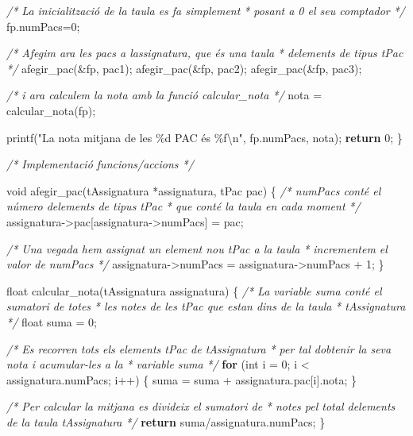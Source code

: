 \documentclass[]{book}
\newenvironment{Shaded}{\begin{snugshade}}{\end{snugshade}}
\newcommand{\CommentTok}[1]{\textcolor[rgb]{0.56,0.35,0.01}{\textit{#1}}}
\newcommand{\ControlFlowTok}[1]{\textcolor[rgb]{0.13,0.29,0.53}{\textbf{#1}}}
\newcommand{\DataTypeTok}[1]{\textcolor[rgb]{0.13,0.29,0.53}{#1}}
\newcommand{\DecValTok}[1]{\textcolor[rgb]{0.00,0.00,0.81}{#1}}
\newcommand{\NormalTok}[1]{#1}
\newcommand{\SpecialCharTok}[1]{\textcolor[rgb]{0.00,0.00,0.00}{#1}}
\newcommand{\StringTok}[1]{\textcolor[rgb]{0.31,0.60,0.02}{#1}}
\begin{document}
\begin{Shaded}
\begin{Highlighting}[]
    \CommentTok{/* La inicialització de la taula es fa simplement}
\CommentTok{     * posant a 0 el seu comptador }
\CommentTok{     */}
\NormalTok{    fp.numPacs=}\DecValTok{0}\NormalTok{;}

    \CommentTok{/* Afegim ara les pacs a l\textquotesingle{}assignatura, que és una taula}
\CommentTok{     * d\textquotesingle{}elements de tipus tPac }
\CommentTok{     */}
\NormalTok{    afegir\_pac(\&fp, pac1);}
\NormalTok{    afegir\_pac(\&fp, pac2);}
\NormalTok{    afegir\_pac(\&fp, pac3);}

    \CommentTok{/* i ara calculem la nota amb la funció calcular\_nota */}
\NormalTok{    nota = calcular\_nota(fp);}

\NormalTok{    printf(}\StringTok{"La nota mitjana de les \%d PAC és \%f}\SpecialCharTok{\textbackslash{}n}\StringTok{"}\NormalTok{, fp.numPacs, nota);}
    \ControlFlowTok{return} \DecValTok{0}\NormalTok{;}
\NormalTok{\}}

\CommentTok{/* Implementació funcions/accions */}

\DataTypeTok{void}\NormalTok{ afegir\_pac(tAssignatura *assignatura, tPac pac) \{}
    \CommentTok{/* numPacs conté el número d\textquotesingle{}elements de tipus tPac}
\CommentTok{     * que conté la taula en cada moment }
\CommentTok{     */}
\NormalTok{    assignatura{-}\textgreater{}pac[assignatura{-}\textgreater{}numPacs] = pac;}

    \CommentTok{/* Una vegada hem assignat un element nou tPac a la taula}
\CommentTok{     * incrementem el valor de numPacs }
\CommentTok{     */}
\NormalTok{    assignatura{-}\textgreater{}numPacs = assignatura{-}\textgreater{}numPacs + }\DecValTok{1}\NormalTok{;}
\NormalTok{\}}

\DataTypeTok{float}\NormalTok{ calcular\_nota(tAssignatura assignatura) \{}
    \CommentTok{/* La variable suma conté el sumatori de totes}
\CommentTok{     * les notes de les tPac que estan dins de la taula}
\CommentTok{     * tAssignatura }
\CommentTok{     */}
    \DataTypeTok{float}\NormalTok{ suma = }\DecValTok{0}\NormalTok{;}

    \CommentTok{/* Es recorren tots els elements tPac de tAssignatura}
\CommentTok{     * per tal d\textquotesingle{}obtenir la seva nota i acumular{-}les a la}
\CommentTok{     * variable suma }
\CommentTok{     */}
    \ControlFlowTok{for}\NormalTok{ (}\DataTypeTok{int}\NormalTok{ i = }\DecValTok{0}\NormalTok{; i \textless{} assignatura.numPacs; i++) \{}
\NormalTok{        suma = suma + assignatura.pac[i].nota;}
\NormalTok{    \}}

    \CommentTok{/* Per calcular la mitjana es divideix el sumatori de}
\CommentTok{     * notes pel total d\textquotesingle{}elements de la taula tAssignatura }
\CommentTok{     */}
    \ControlFlowTok{return}\NormalTok{ suma/assignatura.numPacs;}
\NormalTok{\}}
\end{Highlighting}
\end{Shaded}
\end{document}
